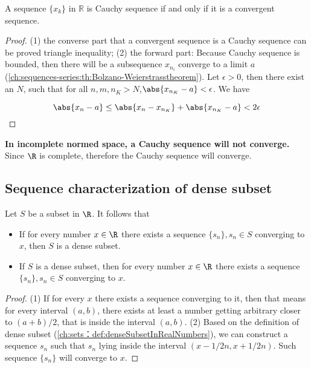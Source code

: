 \begin{refsection}
\begin{theorem}\label{ch:sequences-series:th:CauchySequenceIsConvergent}
	\cite[66]{abbott2001understanding}
	A sequence $\{x_k\}$ in $\mathbb{R}$ is Cauchy sequence if and only if it is a convergent sequence. 
\end{theorem}
\begin{proof}
	(1) the converse part that a convergent sequence is a Cauchy sequence can be proved triangle inequality; (2) the forward part: 
	Because Cauchy sequence is bounded, then there will be a subsequence $x_{n_i}$ converge to a limit $a$(\autoref{ch:sequences-series:th:Bolzano-Weierstrasstheorem}). 
	Let $\epsilon >0$, then there exist an $N$, such that for all $n,m,n_K > N$,$\abs{x_{n_K}-a} < \epsilon$.
	We have
	
	$$\abs{x_n - a} \leq \abs{x_n-x_{n_K}} + \abs{x_{n_K}-a} < 2\epsilon$$	
\end{proof}


\begin{remark}
\textbf{In incomplete normed space, a Cauchy sequence will not converge.} Since $\R$ is complete, therefore the Cauchy sequence will converge.
\end{remark}



\subsection{Sequence characterization of dense subset}

\begin{theorem}\cite[36]{fitzpatrick2006advanced}
Let $S$ be a subset in $\R$. It follows that 
\begin{itemize}
	\item If for every number $x \in \R$ there exists a sequence $\{s_n\}, s_n\in S$ converging to $x$, then $S$ is a dense subset. 
	\item If $S$ is a dense subset, then  for every number $x \in \R$ there exists a sequence $\{s_n\}, s_n\in S$ converging to $x$.
\end{itemize}	
\end{theorem}
\begin{proof}
(1) If for every $x$ there exists a sequence converging to it, then that means for every interval $(a,b)$, there exists at least a number getting arbitrary closer to $(a+b)/2$, that is inside the interval $(a,b)$.
(2)  Based on the definition of dense subset (\autoref{ch:sets：def:denseSubsetInRealNumbers}), we can construct a sequence $s_n$ such that $s_n$ lying inside the interval $(x-1/2n,x+1/2n)$. Such sequence $\{s_n\}$ will converge to $x$.
\end{proof}


\end{refsection}
